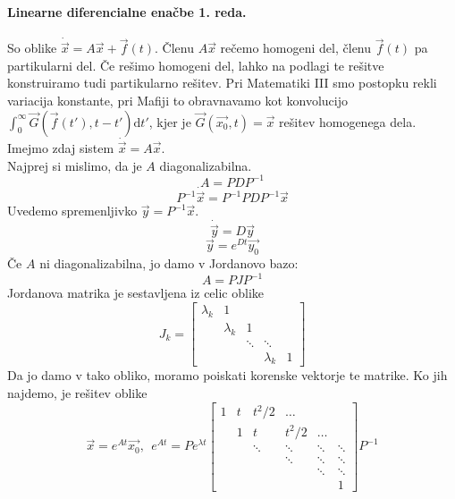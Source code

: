 \documentclass[a4paper]{article}
\newcommand{\vct}[1]{\overrightarrow{#1}}
\newcommand{\dif}{\mathrm{d}}
\begin{document}
\paragraph{Linearne diferencialne enačbe 1. reda.}
So oblike $\dot{\vct{x}} = A\vct{x} + \vct{f}(t)$. Členu $A\vct{x}$ rečemo homogeni del, členu $\vct{f}(t)$ pa partikularni del.
Če rešimo homogeni del, lahko na podlagi te rešitve konstruiramo tudi partikularno rešitev. Pri Matematiki III smo postopku rekli
variacija konstante, pri Mafiji to obravnavamo kot konvolucijo $\displaystyle\int_{0}^{\infty}\vct{G}(\vct{f}(t'), t-t')\dif t'$,
kjer je $\vct{G}(\vct{x_0}, t) = \vct{x}$ rešitev homogenega dela.
Imejmo zdaj sistem $\dot{\vct{x}} = A\vct{x}$. \\ Najprej si mislimo, da je $A$ diagonalizabilna.
$$A = PDP^{-1}$$
$$P^{-1}\dot{\vct{x}} = P^{-1}PDP^{-1}\vct{x}$$
Uvedemo spremenljivko $\vct{y} = P^{-1}\vct{x}$.
$$\dot{\vct{y}} = D\vct{y}$$
$$\vct{y} = e^{Dt}\vct{y_0}$$
Če $A$ ni diagonalizabilna, jo damo v Jordanovo bazo:
$$A = PJP^{-1}$$
Jordanova matrika je sestavljena iz celic oblike
$$J_k = \begin{bmatrix}
    \lambda_k & 1 &&& \\
    & \lambda_k & 1 && \\
    && \ddots & \ddots & \\
    &&& \lambda_k & 1
\end{bmatrix}$$
Da jo damo v tako obliko, moramo poiskati korenske vektorje te matrike. Ko jih najdemo, je rešitev oblike
$$\vct{x} = e^{At}\vct{x_0},~~e^{At} = Pe^{\lambda t} \begin{bmatrix}
    1 & t & t^2/2 & \dots & & \\
    & 1 & t & t^2/2 & \dots &  \\
    & & \ddots & \ddots & \ddots & \ddots \\
    &&& \ddots & \ddots & \ddots  \\
    &&&& \ddots & \ddots  \\
    &&&&& 1
\end{bmatrix} P^{-1}$$
\end{document}

